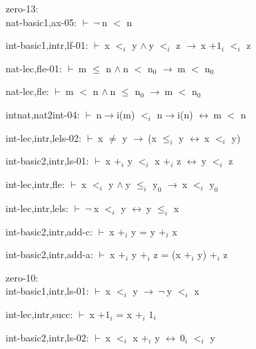 \documentclass[a4paper]{article}
\newcommand{\Fol}{\mbox{$\vdash\ $}}
\newcommand{\Not}{\mbox{$\neg\ $}}
\newcommand{\And}{\mbox{$\wedge\ $}}
\newcommand{\Imp}{\mbox{$\rightarrow\ $}}
\newcommand{\Equiv}{\mbox{$\leftrightarrow\ $}}
\begin{document}
\raggedright
              
zero-13:\\ nat-basic1,ax-05: 
 \Fol \Not n $<$ n



int-basic1,intr,lf-01: 
 \Fol x $\mbox{$<$}_{i}$ y \And y $\mbox{$<$}_{i}$ z \Imp x $\mbox{+1}_{i}$ $\mbox{$<$}_{i}$ z



nat-lec,fle-01: 
 \Fol m $\le$ n \And n $<$ $\mbox{n}_{0}$ \Imp m $<$ $\mbox{n}_{0}$



nat-lec,fle: 
 \Fol m $<$ n \And n $\le$ $\mbox{n}_{0}$ \Imp m $<$ $\mbox{n}_{0}$



intnat,nat2int-04: 
 \Fol n$\to$i(m) $\mbox{$<$}_{i}$ n$\to$i(n) \Equiv m $<$ n



int-lec,intr,lels-02: 
 \Fol x $\neq$ y \Imp (x $\mbox{$\le$}_{i}$ y \Equiv x $\mbox{$<$}_{i}$ y)



int-basic2,intr,ls-01: 
 \Fol x $\mbox{+}_{i}$ y $\mbox{$<$}_{i}$ x $\mbox{+}_{i}$ z \Equiv y $\mbox{$<$}_{i}$ z



int-lec,intr,fle: 
 \Fol x $\mbox{$<$}_{i}$ y \And y $\mbox{$\le$}_{i}$ $\mbox{y}_{0}$ \Imp x $\mbox{$<$}_{i}$ $\mbox{y}_{0}$



int-lec,intr,lels: 
 \Fol \Not x $\mbox{$<$}_{i}$ y \Equiv y $\mbox{$\le$}_{i}$ x



int-basic2,intr,add-c: 
 \Fol x $\mbox{+}_{i}$ y = y $\mbox{+}_{i}$ x



int-basic2,intr,add-a: 
 \Fol x $\mbox{+}_{i}$ y $\mbox{+}_{i}$ z = (x $\mbox{+}_{i}$ y) $\mbox{+}_{i}$ z



\bigskip

zero-10:\\ int-basic1,intr,ls-01: 
 \Fol x $\mbox{$<$}_{i}$ y \Imp \Not y $\mbox{$<$}_{i}$ x



int-lec,intr,succ: 
 \Fol x $\mbox{+1}_{i}$ = x $\mbox{+}_{i}$ $\mbox{1}_{i}$



int-basic2,intr,ls-02: 
 \Fol x $\mbox{$<$}_{i}$ x $\mbox{+}_{i}$ y \Equiv $\mbox{0}_{i}$ $\mbox{$<$}_{i}$ y
\end{document}
